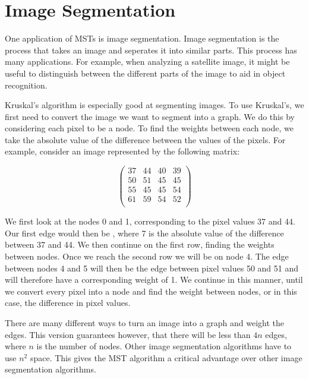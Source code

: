 
\section*{Image Segmentation}


One application of MSTs is image segmentation. Image segmentation is the process that takes an image and seperates it into similar parts. This process has many applications. For example, when analyzing a satellite image, it might be useful to distinguish between the different parts of the image to aid in object recognition.

Kruskal's algorithm is especially good at segmenting images. To use Kruskal's, we first need to convert the image we want to segment into a graph. We do this by considering each pixel to be a node. To find the weights between each node, we take the absolute value of the difference between the values of the pixels. For example, consider an image represented by the following matrix:

\[
\begin{pmatrix}
37 & 44 & 40 & 39 \\
50 & 51 & 45 & 45 \\
55 & 45 & 45 & 54 \\
61 & 59 & 54 & 52 \\
\end{pmatrix}
\]

We first look at the nodes 0 and 1, corresponding to the pixel values 37 and 44. Our first edge would then be , where 7 is the absolute value of the difference between 37 and 44. We then continue on the first row, finding the weights between nodes. Once we reach the second row we will be on node 4. The edge between nodes 4 and 5 will then be the edge between pixel values 50 and 51 and will therefore have a corresponding weight of 1. We continue in this manner, until we convert every pixel into a node and find the weight between nodes, or in this case, the difference in pixel values. 
	
There are many different ways to turn an image into a graph and weight the edges. This version guarantees however, that there will be less than $4n$ edges, where $n$ is the number of nodes. Other image segmentation algorithms have to use $n^2$ space.
This gives the MST algorithm a critical advantage over other image segmentation algorithms.

